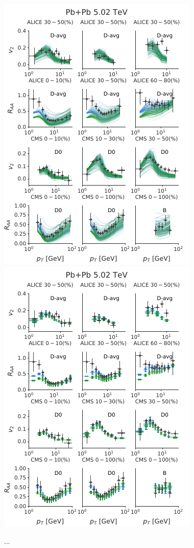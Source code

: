 \documentclass[aps, prc, reprint, amsmath, groupedaddress, nofootinbib]{revtex4-1}
\begin{document}
\begin{figure}
\includegraphics[width=.49\textwidth]{observables_design.pdf}
\includegraphics[width=.49\textwidth]{observables_posterior.pdf}
\caption{...}\label{plots:deisgn_posterior_obs}
\end{figure}
\end{document}
